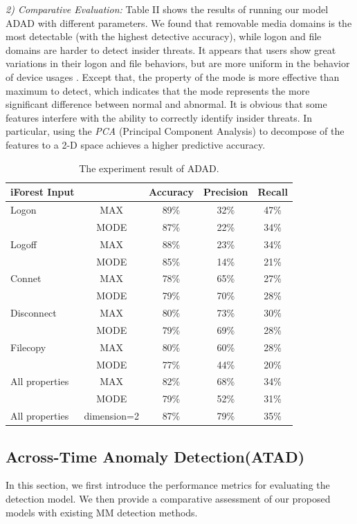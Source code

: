 \documentclass[conference]{IEEEtran}
\begin{document}
\emph{2) Comparative Evaluation:} Table II shows the results of running our model ADAD with different parameters.
We found that removable media domains is the most detectable (with the highest detective accuracy), while logon and file domains are harder to detect insider threats. It appears that users show great variations in their logon and file behaviors, but are more uniform in the behavior of device usages . Except that, the property of the mode is more effective than maximum to detect, which indicates that the mode represents the more significant difference between normal and abnormal. It is obvious that some features interfere with the ability to correctly identify insider threats. In particular, using the \emph{PCA} (Principal Component Analysis) to decompose of the features to a 2-D space achieves a higher predictive accuracy.


\begin{table}[tbp]
\caption{The experiment result of ADAD.}
\centering  %
\begin{tabular}{lcccc}  %
\hline
iForest Input & 	&Accuracy &Precision &Recall\\ \hline
	
Logon 	& MAX &89\% &32\% &47\%\\
  & MODE &87\% &22\% &34\%\\\hline
Logoff 	& MAX &88\% &23\% &34\%\\
   & MODE &85\% &14\% &21\%\\\hline
Connet 	& MAX &78\% &65\% &27\%\\
  & MODE &79\% &70\% &28\%\\\hline
Disconnect 	& MAX &80\% &73\% &30\%\\
  & MODE &79\% &69\% &28\%\\\hline
Filecopy 	& MAX &80\% &60\% &28\%\\
  & MODE &77\% &44\% &20\%\\\hline
All properties 	& MAX &82\% &68\% &34\%\\
  & MODE &79\% &52\% &31\%\\\hline
All properties 	& dimension=2 &87\% &79\% &35\%\\\hline

\end{tabular}

\end{table}


\subsection{Across-Time Anomaly Detection(ATAD)}
In this section, we first introduce the performance metrics for
evaluating the detection model. We then provide a
comparative assessment of our proposed models with existing MM detection methods.
\end{document}
